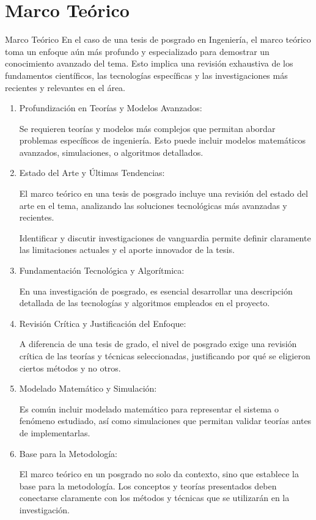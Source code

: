 \documentclass[9pt]{beamer}
\begin{document}
\section{Marco Teórico}
\begin{frame}{Marco Teórico}
En el caso de una tesis de posgrado en Ingeniería, el marco teórico toma un enfoque aún más profundo y especializado para demostrar un conocimiento avanzado del tema. Esto implica una revisión exhaustiva de los fundamentos científicos, las tecnologías específicas y las investigaciones más recientes y relevantes en el área.

\begin{enumerate}
    \item Profundización en Teorías y Modelos Avanzados:

    Se requieren teorías y modelos más complejos que permitan abordar problemas específicos de ingeniería. Esto puede incluir modelos matemáticos avanzados, simulaciones, o algoritmos detallados.

   \item Estado del Arte y Últimas Tendencias:

    El marco teórico en una tesis de posgrado incluye una revisión del estado del arte en el tema, analizando las soluciones tecnológicas más avanzadas y recientes.

    Identificar y discutir investigaciones de vanguardia permite definir claramente las limitaciones actuales y el aporte innovador de la tesis.

    \item Fundamentación Tecnológica y Algorítmica:

    En una investigación de posgrado, es esencial desarrollar una descripción detallada de las tecnologías y algoritmos empleados en el proyecto.

    \item Revisión Crítica y Justificación del Enfoque:

    A diferencia de una tesis de grado, el nivel de posgrado exige una revisión crítica de las teorías y técnicas seleccionadas, justificando por qué se eligieron ciertos métodos y no otros.

    \item Modelado Matemático y Simulación:

    Es común incluir modelado matemático para representar el sistema o fenómeno estudiado, así como simulaciones que permitan validar teorías antes de implementarlas.

    \item Base para la Metodología:

    El marco teórico en un posgrado no solo da contexto, sino que establece la base para la metodología. Los conceptos y teorías presentados deben conectarse claramente con los métodos y técnicas que se utilizarán en la investigación.
\end{enumerate}
\end{frame}
\end{document}

